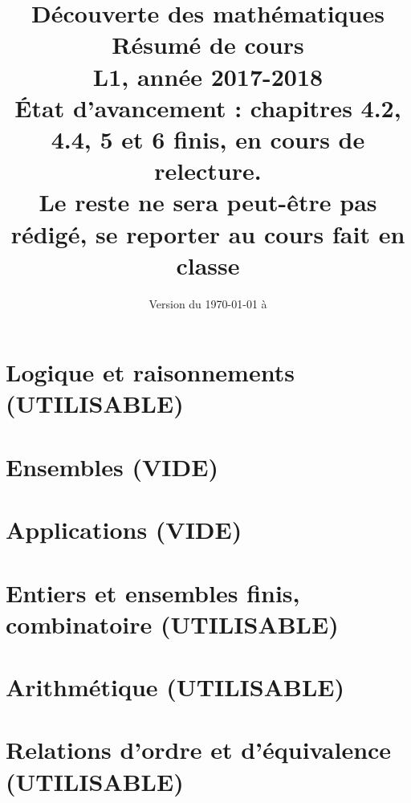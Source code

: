 \documentclass[11pt,a4paper]{book}
\theoremstyle{definition}
\begin{document}
\title{Découverte des mathématiques\\
Résumé de cours\\
L1, année 2017-2018\\
{\small 
\'Etat d'avancement : chapitres 4.2, 4.4, 5 et 6 finis, en cours de relecture.\\ Le reste ne sera peut-être pas rédigé, se reporter au cours fait en classe}}
\date{Version du \today{} à \currenttime}
\maketitle


\tableofcontents





\chapter{Logique et raisonnements (UTILISABLE)}


\chapter{Ensembles (VIDE)}


\chapter{Applications (VIDE)}


\chapter{Entiers et ensembles finis, combinatoire (UTILISABLE)}


\chapter{Arithmétique (UTILISABLE)}


\chapter{Relations d'ordre et d'équivalence (UTILISABLE)}

\end{document}
